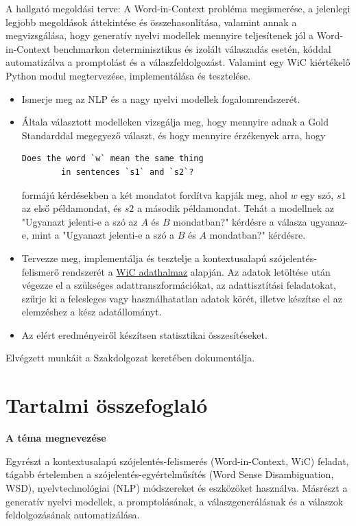 \documentclass[12pt]{report}
\theoremstyle{definition}
\begin{document}
A hallgató megoldási terve:
A Word-in-Context probléma megismerése, a jelenlegi legjobb megoldások áttekintése és összehasonlítása, valamint annak a megvizsgálása, hogy generatív nyelvi modellek mennyire teljesítenek jól a Word-in-Context benchmarkon determinisztikus és izolált válaszadás esetén, kóddal automatizálva a promptolást és a válaszfeldolgozást. Valamint egy WiC kiértékelő Python modul megtervezése, implementálása és tesztelése.
\begin{itemize}
	\item Ismerje meg az NLP és a nagy nyelvi modellek fogalomrendszerét.
	\item Általa választott modelleken vizsgálja meg, hogy mennyire adnak a Gold Standarddal megegyező választ, és hogy mennyire érzékenyek arra, hogy
	      \begin{verbatim}Does the word `w` mean the same thing
        in sentences `s1` and `s2`?\end{verbatim}
	      formájú kérdésekben a két mondatot fordítva kapják meg, ahol $w$ egy szó, $s1$ az első példamondat, és $s2$ a második példamondat. Tehát a modellnek az "Ugyanazt jelenti-e a szó az $A$ és $B$ mondatban?" kérdésre a válasza ugyanaz-e, mint a "Ugyanazt jelenti-e a szó a $B$ és $A$ mondatban?" kérdésre.
	\item Tervezze meg, implementálja és tesztelje a kontextusalapú szójelentés-felismerő rendszerét a \href{https://pilehvar.github.io/wic/}{WiC adathalmaz} alapján. Az adatok letöltése után végezze el a szükséges adattranszformációkat, az adattisztítási feladatokat, szűrje ki a felesleges vagy használhatatlan adatok körét, illetve készítse el az elemzéshez a kész adatállományt.
	\item Az elért eredményeiről készítsen statisztikai összesítéseket.
\end{itemize}
Elvégzett munkáit a Szakdolgozat keretében dokumentálja.

\clearpage

\chapter*{Tartalmi összefoglaló}

\item \textbf{A téma megnevezése}

    Egyrészt a kontextusalapú szójelentés-felismerés (Word-in-Context, WiC) feladat, tágabb értelemben a szójelentés-egyértelműsítés (Word Sense Disambiguation,
    WSD), nyelvtechnológiai (NLP) módszereket és eszközöket használva. Másrészt a generatív nyelvi modellek, a promptolásának, a válaszgenerálásnak és a válaszok feldolgozásának automatizálása.
\end{document}
